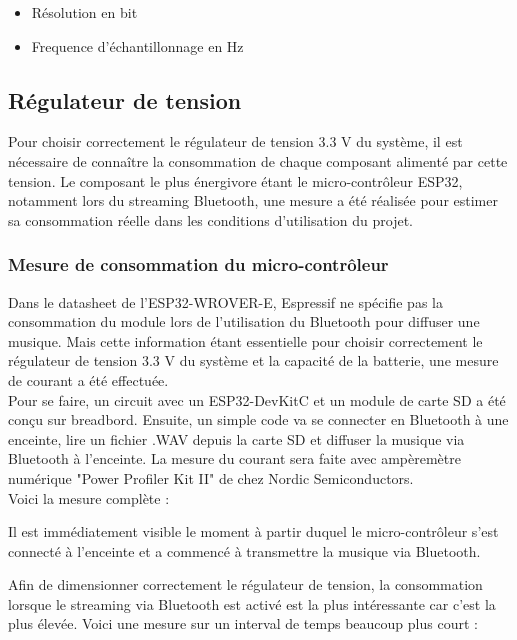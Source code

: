 \begin{itemize}
    \item Résolution en bit
    \item Frequence d'échantillonnage en Hz
\end{itemize}

\clearpage
\subsection{Régulateur de tension}
Pour choisir correctement le régulateur de tension 3.3 V du système, il est nécessaire de connaître la consommation de chaque composant alimenté par cette tension. Le composant le plus énergivore étant le micro-contrôleur ESP32, notamment lors du streaming Bluetooth, une mesure a été réalisée pour estimer sa consommation réelle dans les conditions d'utilisation du projet.

\subsubsection{Mesure de consommation du micro-contrôleur}

Dans le datasheet de l'ESP32-WROVER-E, Espressif ne spécifie pas la consommation du module lors de l'utilisation du Bluetooth pour diffuser une musique. Mais cette information étant essentielle pour choisir correctement le régulateur de tension 3.3 V du système et la capacité de la batterie, une mesure de courant a été effectuée. \\

Pour se faire, un circuit avec un ESP32-DevKitC et un module de carte SD a été conçu sur breadbord. Ensuite, un simple code va se connecter en Bluetooth à une enceinte, lire un fichier .WAV depuis la carte SD et diffuser la musique via Bluetooth à l'enceinte. La mesure du courant sera faite avec ampèremètre numérique "Power Profiler Kit II" de chez Nordic Semiconductors. \\

Voici la mesure complète :


Il est immédiatement visible le moment à partir duquel le micro-contrôleur s'est connecté à l'enceinte et a commencé à transmettre la musique via Bluetooth.

Afin de dimensionner correctement le régulateur de tension, la consommation lorsque le streaming via Bluetooth est activé est la plus intéressante car c'est la plus élevée. Voici une mesure sur un interval de temps beaucoup plus court :

